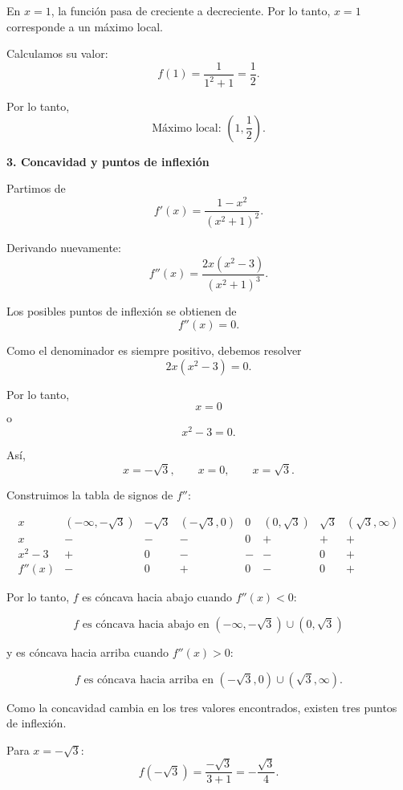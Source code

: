 \documentclass[12pt]{article}
\begin{document}
\begin{enumerate}[label=\roman*.-]
    En $x=1$, la función pasa de creciente a decreciente. Por lo tanto,
    $x=1$ corresponde a un máximo local.

    Calculamos su valor:
    \[
    f(1)
    =
    \frac{1}{1^2+1}
    =
    \frac12.
    \]

    Por lo tanto,
    \[
    \boxed{
    \text{Máximo local: }
    \left(1,\frac12\right)
    }.
    \]

    \textbf{3. Concavidad y puntos de inflexión}

    Partimos de
    \[
    f'(x)=\frac{1-x^2}{(x^2+1)^2}.
    \]

    Derivando nuevamente:
    \[
    f''(x)
    =
    \frac{2x(x^2-3)}{(x^2+1)^3}.
    \]

    Los posibles puntos de inflexión se obtienen de
    \[
    f''(x)=0.
    \]

    Como el denominador es siempre positivo, debemos resolver
    \[
    2x(x^2-3)=0.
    \]

    Por lo tanto,
    \[
    x=0
    \]
    o
    \[
    x^2-3=0.
    \]

    Así,
    \[
    x=-\sqrt3,\qquad x=0,\qquad x=\sqrt3.
    \]

    Construimos la tabla de signos de $f''$:

    \[
    \begin{array}{c|ccccccc}
    x &
    (-\infty,-\sqrt3) &
    -\sqrt3 &
    (-\sqrt3,0) &
    0 &
    (0,\sqrt3) &
    \sqrt3 &
    (\sqrt3,\infty)
    \\
    \hline
    x & - & - & - & 0 & + & + & +\\
    x^2-3 & + & 0 & - & - & - & 0 & +\\
    \hline
    f''(x) & - & 0 & + & 0 & - & 0 & +
    \end{array}
    \]

    Por lo tanto, $f$ es cóncava hacia abajo cuando $f''(x)<0$:

    \[
    \boxed{
    f \text{ es cóncava hacia abajo en }
    (-\infty,-\sqrt3)\cup(0,\sqrt3)
    }
    \]

    y es cóncava hacia arriba cuando $f''(x)>0$:

    \[
    \boxed{
    f \text{ es cóncava hacia arriba en }
    (-\sqrt3,0)\cup(\sqrt3,\infty)
    }.
    \]

    Como la concavidad cambia en los tres valores encontrados,
    existen tres puntos de inflexión.

    Para $x=-\sqrt3$:
    \[
    f(-\sqrt3)
    =
    \frac{-\sqrt3}{3+1}
    =
    -\frac{\sqrt3}{4}.
    \]


\end{enumerate}
\end{document}
